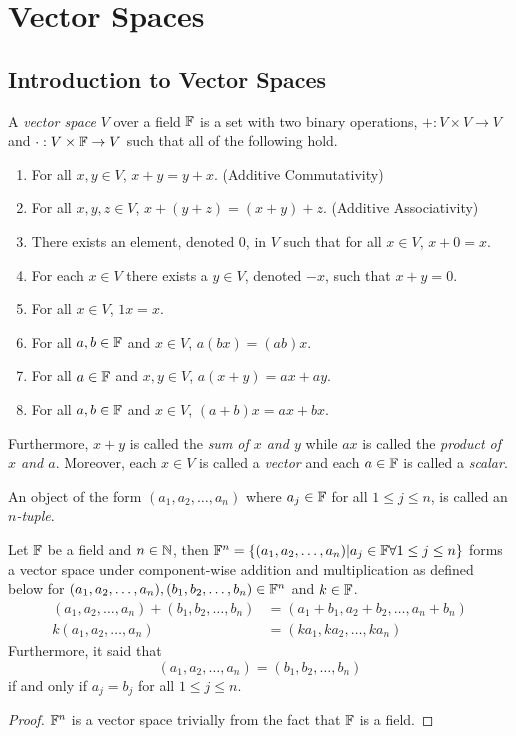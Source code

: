 \section{Vector Spaces}

\subsection{Introduction to Vector Spaces}

\begin{definition}
	A \textit{vector space} $V$ over a field $\mathbb{F}$ is a set with two binary operations, $+:V\times V\rightarrow V$ and $\cdot:V\times\mathbb{F}\rightarrow V$ such that all of the following hold.
	\begin{enumerate}
		\item For all $x,y\in V$, $x+y=y+x$. (Additive Commutativity)
		\item For all $x,y,z\in V$, $x+(y+z)=(x+y)+z$. (Additive Associativity)
		\item There exists an element, denoted 0, in $V$ such that for all $x\in V$, $x+0=x$.
		\item For each $x\in V$ there exists a $y\in V$, denoted $-x$, such that $x+y=0$.
		\item For all $x\in V$, $1x=x$.
		\item For all $a,b\in\mathbb{F}$ and $x\in V$, $a(bx)=(ab)x$.
		\item For all $a\in\mathbb{F}$ and $x,y\in V$, $a(x+y)=ax+ay$.
		\item For all $a,b\in\mathbb{F}$ and $x\in V$, $(a+b)x=ax+bx$.
	\end{enumerate}
	Furthermore, $x+y$ is called the \textit{sum of $x$ and $y$} while $ax$ is called the \textit{product of $x$ and $a$}.
	Moreover, each $x\in V$ is called a \textit{vector} and each $a\in\mathbb{F}$ is called a \textit{scalar}.
\end{definition}

\begin{definition}[$n$-tuple]
	An object of the form $(a_1,a_2,\ldots,a_n)$ where $a_j\in\mathbb{F}$ for all $1\leq j\leq n$, is called an \textit{$n$-tuple}.
\end{definition}

\begin{example}
	Let $\mathbb{F}$ be a field and $n\in\mathbb{N}$, then $\mathbb{F}^n=\lbrace (a_1,a_2,\ldots,a_n)| a_j\in\mathbb{F} \forall 1\leq j\leq n \rbrace$ forms a vector space under component-wise addition and multiplication as defined below for $(a_1,a_2,\ldots ,a_n),(b_1,b_2,\ldots,b_n)\in\mathbb{F}^n$ and $k\in\mathbb{F}$.
	\begin{align*}
		(a_1,a_2,\ldots ,a_n)+(b_1,b_2,\ldots,b_n)&=(a_1+b_1,a_2+b_2,\ldots,a_n+b_n)\\
		k(a_1,a_2,\ldots ,a_n)&=(ka_1,ka_2,\ldots,ka_n)
	\end{align*}
	Furthermore, it said that
	\[
		(a_1,a_2,\ldots ,a_n)=(b_1,b_2,\ldots,b_n)
	\]
	if and only if $a_j=b_j$ for all $1\leq j\leq n$.
\end{example}
\begin{proof}
	$\mathbb{F}^n$ is a vector space trivially from the fact that $\mathbb{F}$ is a field.
\end{proof}

